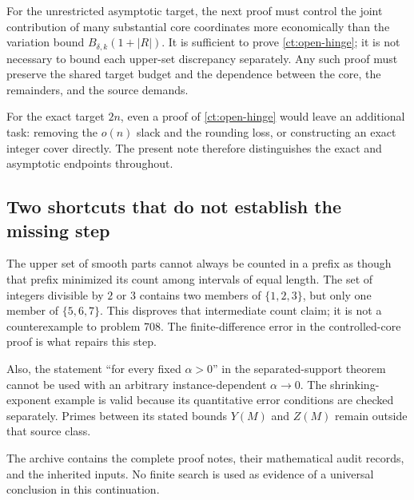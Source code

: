 For the unrestricted asymptotic target, the next proof must control
the joint contribution of many substantial core coordinates more
economically than the variation bound
\(B_{\delta,k}(1+|R|)\). It is sufficient to prove
\eqref{ct:open-hinge}; it is not necessary to bound each upper-set
discrepancy separately. Any such proof must preserve the shared
target budget and the dependence between the core, the remainders,
and the source demands.

For the exact target \(2n\), even a proof of
\eqref{ct:open-hinge} would leave an additional task: removing the
\(o(n)\) slack and the rounding loss, or constructing an exact
integer cover directly. The present note therefore distinguishes
the exact and asymptotic endpoints throughout.

\subsection{Two shortcuts that do not establish the missing step}

The upper set of smooth parts cannot always be counted in a prefix
as though that prefix minimized its count among intervals of equal
length. The set of integers divisible by \(2\) or \(3\) contains
two members of \(\{1,2,3\}\), but only one member of
\(\{5,6,7\}\). This disproves that intermediate count claim;
it is not a counterexample to problem 708. The finite-difference
error in the controlled-core proof is what repairs this step.

Also, the statement ``for every fixed \(\alpha>0\)'' in the
separated-support theorem cannot be used with an arbitrary
instance-dependent \(\alpha\to0\). The shrinking-exponent example
is valid because its quantitative error conditions are checked
separately. Primes between its stated bounds \(Y(M)\) and \(Z(M)\)
remain outside that source class.

The archive contains the complete proof notes, their mathematical
audit records, and the inherited inputs. No finite search is used
as evidence of a universal conclusion in this continuation.
